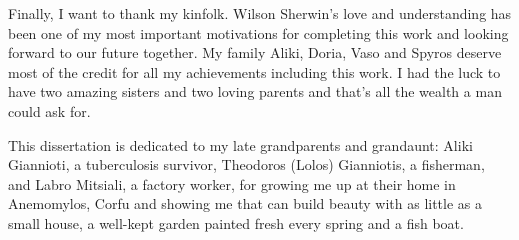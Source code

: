 Finally, I want to thank my kinfolk. Wilson Sherwin's love and understanding has been one of my
most important motivations for completing this work and looking forward to our future together.
My family Aliki, Doria, Vaso and Spyros deserve most of the credit for all my achievements including
this work. I had the luck to have two amazing sisters and two loving parents and that's all the wealth 
a man could ask for. 

This dissertation is dedicated to my late grandparents and grandaunt: 
Aliki Giannioti, a tuberculosis survivor, Theodoros (Lolos) Gianniotis, a fisherman, and
Labro Mitsiali, a factory  worker, for growing me up at their home in Anemomylos, Corfu and showing me that can build beauty with as little as
a small house, a well-kept garden painted fresh every spring and a fish 
boat.


